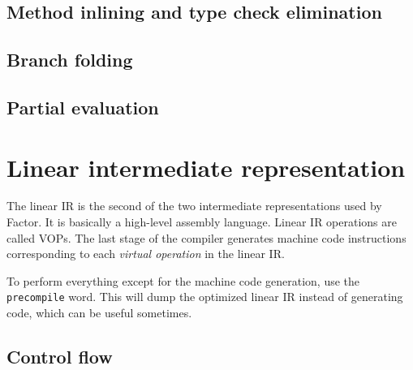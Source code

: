 \documentclass{book}
\begin{document}
\subsection{Method inlining and type check elimination}

\subsection{Branch folding}

\subsection{Partial evaluation}

\section{Linear intermediate representation}

The linear IR is the second of the two intermediate
representations used by Factor. It is basically a high-level
assembly language. Linear IR operations are called VOPs. The last stage of the compiler generates machine code instructions corresponding to each \emph{virtual operation} in the linear IR.

To perform everything except for the machine code generation, use the \texttt{precompile} word. This will dump the optimized linear IR instead of generating code, which can be useful sometimes.

\subsection{Control flow}
\end{document}
